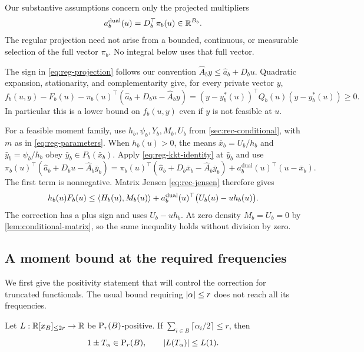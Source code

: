 Our substantive assumptions concern only the projected multipliers
\begin{equation}\label{eq:reg-projection}
 a_b^{\mathrm{dual}}(u)=D_b^\top\pi_b(u)\in\mathbb{R}^{B_b}.
\end{equation}
The regular projection need not arise from a bounded, continuous, or
measurable selection of the full vector $\pi_b$. No integral below uses
that full vector.

The sign in \eqref{eq:reg-projection} follows our convention
$\widehat A_by\le\widehat a_b+D_bu$. Quadratic expansion, stationarity,
and complementarity give, for every private vector $y$,
\begin{equation}\label{eq:reg-kkt-identity}
 f_b(u,y)-F_b(u)
 -\pi_b(u)^\top(\widehat a_b+D_bu-\widehat A_by)
 =(y-y_b^*(u))^\top Q_b(u)(y-y_b^*(u))\ge0.
\end{equation}
In particular this is a lower bound on $f_b(u,y)$ even if $y$ is not
feasible at $u$.

For a feasible moment family, use $h_b,\psi_b,Y_b,M_b,U_b$ from
\cref{sec:rec-conditional}, with $m$ as in \eqref{eq:reg-parameters}.
When $h_b(u)>0$, the means $\bar x_b=U_b/h_b$ and
$\bar y_b=\psi_b/h_b$ obey $\bar y_b\in P_b(\bar x_b)$.
Apply \eqref{eq:reg-kkt-identity} at $\bar y_b$ and use
\[
 \pi_b(u)^\top(\widehat a_b+D_bu-\widehat A_b\bar y_b)
 =\pi_b(u)^\top(\widehat a_b+D_b\bar x_b-\widehat A_b\bar y_b)
    +a_b^{\mathrm{dual}}(u)^\top(u-\bar x_b).
\]
The first term is nonnegative. Matrix Jensen
\eqref{eq:rec-jensen} therefore gives
\begin{equation}\label{eq:reg-conditional}
 h_b(u)F_b(u)\le\langle H_b(u),M_b(u)\rangle
   +a_b^{\mathrm{dual}}(u)^\top\bigl(U_b(u)-u h_b(u)\bigr).
\end{equation}
The correction has a plus sign and uses $U_b-u h_b$. At zero density
$M_b=U_b=0$ by \cref{lem:conditional-matrix}, so the same inequality
holds without division by zero.

\subsection{A moment bound at the required frequencies}
\label{sec:reg-half-degree}

We first give the positivity statement that will control the correction
for truncated functionals. The usual bound requiring $\lvert \alpha\rvert\le r$
does not reach all its frequencies.

\begin{lemma}\label{lem:half-degree}
Let $L:\mathbb{R}[x_B]_{\le 2r}\to\mathbb{R}$ be $\mathrm{P}_r(B)$-positive. If
$\sum_{i\in B}\lceil\alpha_i/2\rceil\le r$, then
\[
 1\pm T_\alpha\in\mathrm{P}_r(B),\qquad
 \lvert L(T_\alpha)\rvert\le L(1).
\]
\end{lemma}

